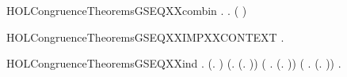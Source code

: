 \begin{SaveVerbatim}{HOLCongruenceTheoremsGSEQXXcombin}
\HOLTokenTurnstile{} \HOLSymConst{\HOLTokenForall{}}.   \HOLSymConst{\HOLTokenImp{}} \HOLSymConst{\HOLTokenForall{}}.   \HOLSymConst{\HOLTokenImp{}}  ( \HOLConst{\HOLTokenCompose} )
\end{SaveVerbatim}
\newcommand{\HOLCongruenceTheoremsGSEQXXcombin}{\UseVerbatim{HOLCongruenceTheoremsGSEQXXcombin}}
\begin{SaveVerbatim}{HOLCongruenceTheoremsGSEQXXIMPXXCONTEXT}
\HOLTokenTurnstile{} \HOLSymConst{\HOLTokenForall{}}.   \HOLSymConst{\HOLTokenImp{}}  
\end{SaveVerbatim}
\newcommand{\HOLCongruenceTheoremsGSEQXXIMPXXCONTEXT}{\UseVerbatim{HOLCongruenceTheoremsGSEQXXIMPXXCONTEXT}}
\begin{SaveVerbatim}{HOLCongruenceTheoremsGSEQXXind}
\HOLTokenTurnstile{} \HOLSymConst{\HOLTokenForall{}}.
        (\HOLTokenLambda{}. ) \HOLSymConst{\HOLTokenConj{}} (\HOLSymConst{\HOLTokenForall{}}.  (\HOLTokenLambda{}. )) \HOLSymConst{\HOLTokenConj{}}
       (\HOLSymConst{\HOLTokenForall{}} .   \HOLSymConst{\HOLTokenImp{}}  (\HOLTokenLambda{}.  )) \HOLSymConst{\HOLTokenConj{}}
       (\HOLSymConst{\HOLTokenForall{}}   .
              \HOLSymConst{\HOLTokenConj{}}   \HOLSymConst{\HOLTokenImp{}}
             (\HOLTokenLambda{}.   \HOLSymConst{\ensuremath{+}}  )) \HOLSymConst{\HOLTokenImp{}}
       \HOLSymConst{\HOLTokenForall{}}.   \HOLSymConst{\HOLTokenImp{}}  
\end{SaveVerbatim}
